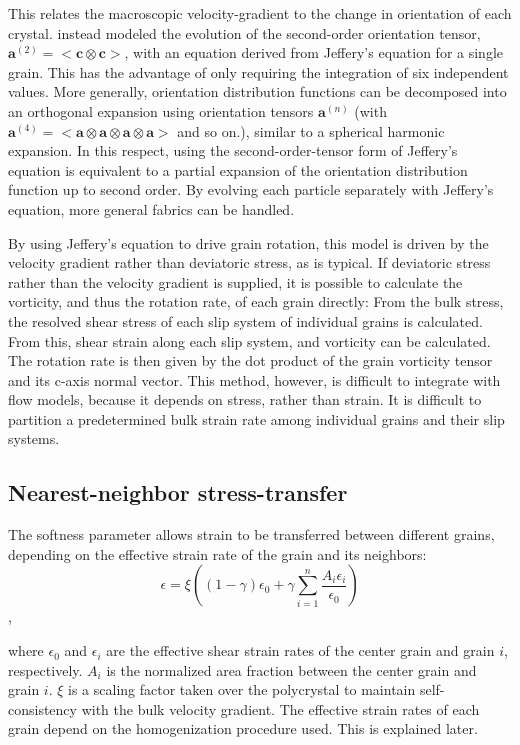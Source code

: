 \documentclass{igs}
\begin{document}
This relates the macroscopic velocity-gradient to the change in orientation of each crystal. \citet{gillet2005} instead modeled the evolution of the  second-order orientation tensor, $\boldsymbol{a}^{(2)} = <\boldsymbol{c} \otimes \boldsymbol{c}>$, with an equation derived from Jeffery's equation for a single grain. This has the advantage of only requiring the integration of six independent values. More generally, orientation distribution functions can be decomposed into an orthogonal expansion using orientation tensors $\boldsymbol{a}^{(n)}$ (with $\boldsymbol{a}^{(4)} = < \boldsymbol{a} \otimes \boldsymbol{a} \otimes \boldsymbol{a} \otimes \boldsymbol{a}>$ and so on.), similar to a spherical harmonic expansion. In this respect, using the second-order-tensor form of Jeffery's equation is equivalent to a partial expansion of the orientation distribution function up to second order. By evolving each particle separately with Jeffery's equation, more general fabrics can be handled.

By using Jeffery's equation to drive grain rotation, this model is driven by the velocity gradient rather than deviatoric stress, as is typical. If deviatoric stress rather than the velocity gradient is supplied, it is possible to calculate the vorticity, and thus the rotation rate, of each grain directly: From the bulk stress, the resolved shear stress of each slip system of individual grains is calculated. From this, shear strain along each slip system, and vorticity can be calculated. The rotation rate is then given by the dot product of the grain vorticity tensor and its c-axis normal vector. This method, however, is difficult to integrate with flow models, because it depends on stress, rather than strain. It is difficult to partition a predetermined bulk strain rate among individual grains and their slip systems.

\subsection{Nearest-neighbor stress-transfer}
The softness parameter allows strain to be transferred between different grains, depending on the effective strain rate of the grain and its neighbors:
\begin{equation}
\epsilon = \xi \left( \left( 1 - \gamma \right)  \epsilon_0 + \gamma \sum_{i=1}^n \frac{A_i \epsilon_i}{\epsilon_0} \right)
\end{equation},

where $\epsilon_0$ and $\epsilon_i$ are the effective shear strain rates of the center grain and grain $i$, respectively. $A_i$ is the normalized area fraction between the center grain and grain $i$. $\xi$ is a scaling factor taken over the polycrystal to maintain self-consistency with the bulk velocity gradient. The effective strain rates of each grain depend on the homogenization procedure used. This is explained later.
\end{document}
